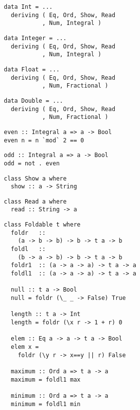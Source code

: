 \begin{multicols}{2}
\begin{verbatim}
data Int = ...
  deriving ( Eq, Ord, Show, Read
           , Num, Integral )
\end{verbatim}
	
\begin{verbatim}
data Integer = ...
  deriving ( Eq, Ord, Show, Read
           , Num, Integral )
\end{verbatim}
	
\begin{verbatim}
data Float = ...
  deriving ( Eq, Ord, Show, Read
           , Num, Fractional )
\end{verbatim}
	
\begin{verbatim}
data Double = ...
  deriving ( Eq, Ord, Show, Read
           , Num, Fractional )
\end{verbatim}
	
\begin{verbatim}
even :: Integral a => a -> Bool 
even n = n `mod` 2 == 0
\end{verbatim}
	
\begin{verbatim}
odd :: Integral a => a -> Bool 
odd = not . even
\end{verbatim}
	
\begin{verbatim}
class Show a where
  show :: a -> String
\end{verbatim}
	
\begin{verbatim}
class Read a where 
  read :: String -> a
\end{verbatim}
	
\begin{verbatim}
class Foldable t where
  foldr   :: 
    (a -> b -> b) -> b -> t a -> b
  foldl   :: 
    (b -> a -> b) -> b -> t a -> b
  foldr1  :: (a -> a -> a) -> t a -> a
  foldl1  :: (a -> a -> a) -> t a -> a

  null :: t a -> Bool 
  null = foldr (\_ _ -> False) True

  length :: t a -> Int
  length = foldr (\x r -> 1 + r) 0

  elem :: Eq a -> a -> t a -> Bool 
  elem x = 
    foldr (\y r -> x==y || r) False

  maximum :: Ord a => t a -> a 
  maximum = foldl1 max

  minimum :: Ord a => t a -> a 
  minimum = foldl1 min


\end{verbatim}
\end{multicols}
